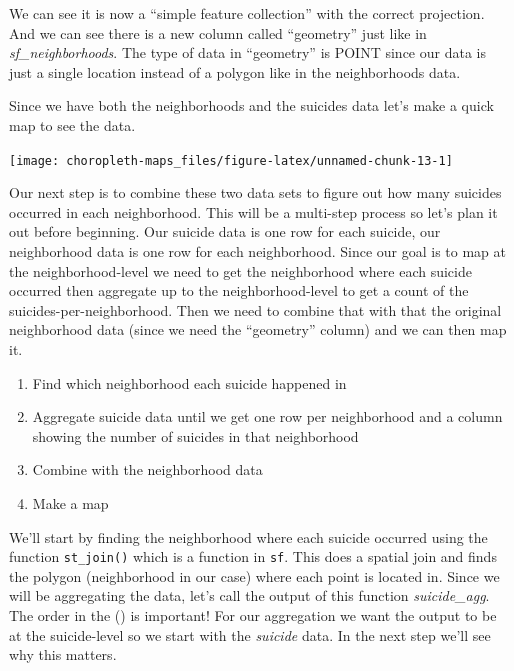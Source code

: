 \documentclass[
  12pt,
]{book}
\newenvironment{Shaded}{\begin{snugshade}}{\end{snugshade}}
\newcommand{\DataTypeTok}[1]{\textcolor[rgb]{0.13,0.29,0.53}{#1}}
\newcommand{\KeywordTok}[1]{\textcolor[rgb]{0.13,0.29,0.53}{\textbf{#1}}}
\newcommand{\NormalTok}[1]{#1}
\newcommand{\OperatorTok}[1]{\textcolor[rgb]{0.81,0.36,0.00}{\textbf{#1}}}
\newcommand{\OtherTok}[1]{\textcolor[rgb]{0.56,0.35,0.01}{#1}}
\newcommand{\StringTok}[1]{\textcolor[rgb]{0.31,0.60,0.02}{#1}}
\providecommand{\tightlist}{%
  \setlength{\itemsep}{0pt}\setlength{\parskip}{0pt}}
\begin{document}
We can see it is now a ``simple feature collection'' with the correct projection. And we can see there is a new column called ``geometry'' just like in \emph{sf\_neighborhoods}. The type of data in ``geometry'' is POINT since our data is just a single location instead of a polygon like in the neighborhoods data.

Since we have both the neighborhoods and the suicides data let's make a quick map to see the data.

\begin{Shaded}
\end{Shaded}

\begin{center}\texttt{[image: choropleth-maps\_files/figure-latex/unnamed-chunk-13-1]} \end{center}

Our next step is to combine these two data sets to figure out how many suicides occurred in each neighborhood. This will be a multi-step process so let's plan it out before beginning. Our suicide data is one row for each suicide, our neighborhood data is one row for each neighborhood. Since our goal is to map at the neighborhood-level we need to get the neighborhood where each suicide occurred then aggregate up to the neighborhood-level to get a count of the suicides-per-neighborhood. Then we need to combine that with that the original neighborhood data (since we need the ``geometry'' column) and we can then map it.

\begin{enumerate}
\def\labelenumi{\arabic{enumi}.}
\tightlist
\item
  Find which neighborhood each suicide happened in
\item
  Aggregate suicide data until we get one row per neighborhood and a column showing the number of suicides in that neighborhood
\item
  Combine with the neighborhood data
\item
  Make a map
\end{enumerate}

We'll start by finding the neighborhood where each suicide occurred using the function \texttt{st\_join()} which is a function in \texttt{sf}. This does a spatial join and finds the polygon (neighborhood in our case) where each point is located in. Since we will be aggregating the data, let's call the output of this function \emph{suicide\_agg}. The order in the () is important! For our aggregation we want the output to be at the suicide-level so we start with the \emph{suicide} data. In the next step we'll see why this matters.
\end{document}
